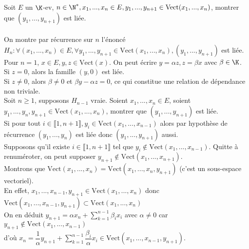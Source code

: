 \documentclass[12pt, a4paper]{report}
\begin{document}
\begin{exemple}[Exercice]{}
Soit $E$ un $\K$-ev, $n \in \N^*, x_1,...,x_n \in E, y_1,...,y_{n+1} \in \text{Vect}(x_1,...,x_n)$, montrer que $(y_1,...,y_{n+1})$ est liée. \\ \\
On montre par récurrence sur $n$ l'énoncé $H_n : \forall (x_1,...,x_n) \in E, \forall y_1,...,y_{n+1} \in \text{Vect}(x_1,...,x_n), (y_1,...,y_{n+1})$ est liée. \\
Pour $n=1$, $x \in E, y, z \in \text{Vect}(x)$. On peut écrire $y = \alpha z, z = \beta x$ avec $\beta \in \K$. \\
Si $z=0$, alors la famille $(y,0)$ est liée. \\
Si $z \ne 0$, alors $\beta \ne 0$ et $\beta y - \alpha z = 0$, ce qui constitue une relation de dépendance non triviale. \\

Soit $n \ge 1$, supposons $H_{n-1}$ vraie. Soient $x_1,...,x_n \in E$, soient $y_1,...,y_n,y_{n+1} \in \text{Vect}(x_1,...,x_n)$, montrer que $(y_1,...,y_{n+1})$ est liée. \\
Si pour tout $i \in \llbracket 1,n+1 \rrbracket, y_i \in \text{Vect}(x_1,...,x_{n-1})$ alors par hypothèse de récurrence $(y_1,...,y_n)$ est liée donc $(y_1,...,y_{n+1})$ aussi. \\
Supposons qu'il existe $i \in \llbracket 1,n+1 \rrbracket$ tel que $y_i \not \in \text{Vect}(x_1,...,x_{n-1})$. Quitte à renuméroter, on peut supposer $y_{n+1} \not \in \text{Vect}(x_1,...,x_{n+1})$. \\
Montrons que $\text{Vect}(x_1,...,x_n) = \text{Vect}(x_1,...,x_n,y_{n+1})$ (c'est un sous-espace vectoriel). \\
En effet, $x_1,...,x_{n-1}, y_{n+1} \in \text{Vect}(x_1,...,x_n)$ donc $\text{Vect}(x_1,...,x_{n-1},y_{n+1}) \subset \text{Vect}(x_1,...,x_n)$ \\
On en déduit $y_{n+1} = \alpha x_n + \displaystyle{\sum_{k=1}^{n-1} \beta_ix_i}$ avec $\alpha \ne 0$ car $y_{n+1} \not \in \text{Vect}(x_1,...,x_{n-1})$ \\
d'où $x_n = \dfrac{1}{\alpha}y_{n+1} + \displaystyle{\sum_{k=1}^{n-1}\dfrac{\beta_i}{\alpha}x_i}\in \text{Vect}(x_1,...,x_{n-1},y_{n+1})$. \\


\end{exemple}
\end{document}
